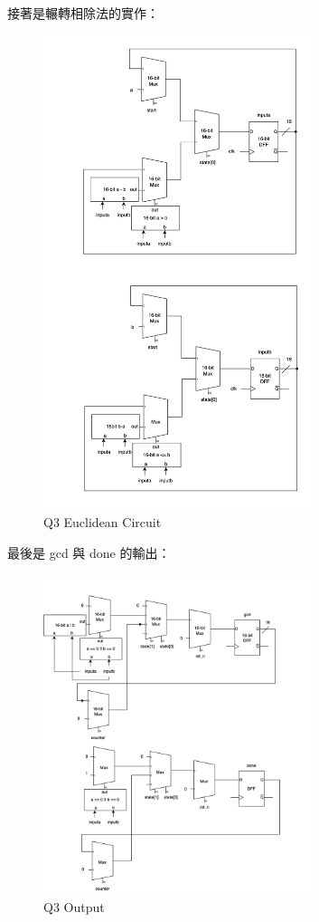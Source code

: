 \documentclass[10.5pt,compsoc,UTF8]{CjC}
\theoremstyle{mystyle}
\begin{document}
\newpage

接著是輾轉相除法的實作：
\begin{figure}[h!]
  \centering
  \includegraphics[width=0.7\textwidth]{./img/Q3-ab.png}
  \caption{Q3 Euclidean Circuit}
  \label{fig:Q3-euclidean}
\end{figure}
\newpage
最後是 gcd 與 done 的輸出：
\begin{figure}[h!]
  \centering
  \includegraphics[width=0.7\textwidth]{./img/Q3-gcd.png}
  \caption{Q3 Output}
  \label{fig:Q3-gcd}
\end{figure}
\end{document}

